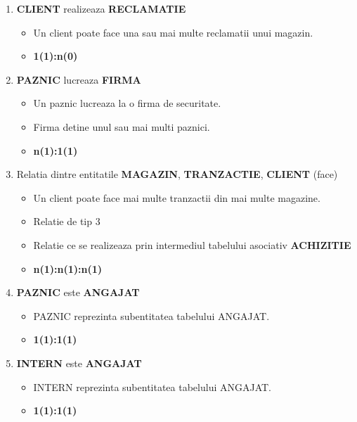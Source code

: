 \begin{enumerate}
    \vspace{0.5cm}

    \item \textbf{CLIENT} realizeaza \textbf{RECLAMATIE}
    \begin{itemize}
        \item Un client poate face una sau mai multe reclamatii unui magazin.
        \item \textbf{1(1):n(0)}
    \end{itemize}

    \vspace{0.5cm}

    \item \textbf{PAZNIC} lucreaza \textbf{FIRMA}
    \begin{itemize}
        \item Un paznic lucreaza la o firma de securitate.
        \item Firma detine unul sau mai multi paznici.
        \item \textbf{n(1):1(1)}
    \end{itemize}

    \vspace{0.5cm}

    \item Relatia dintre entitatile \textbf{MAGAZIN}, \textbf{TRANZACTIE}, \textbf{CLIENT} (face)
    \begin{itemize}
        \item Un client poate face mai multe tranzactii din mai multe magazine.
        \item Relatie de tip 3
        \item Relatie ce se realizeaza prin intermediul tabelului asociativ \textbf{ACHIZITIE}
        \item \textbf{n(1):n(1):n(1)}
    \end{itemize}

    \vspace{0.5cm}

    \item \textbf{PAZNIC} este \textbf{ANGAJAT}
    \begin{itemize}
        \item PAZNIC reprezinta subentitatea tabelului ANGAJAT.
        \item \textbf{1(1):1(1)}
    \end{itemize}
    
    \vspace{0.5cm}

    \item \textbf{INTERN} este \textbf{ANGAJAT}
    \begin{itemize}
        \item INTERN reprezinta subentitatea tabelului ANGAJAT.
        \item \textbf{1(1):1(1)}
    \end{itemize}
    
\end{enumerate}
